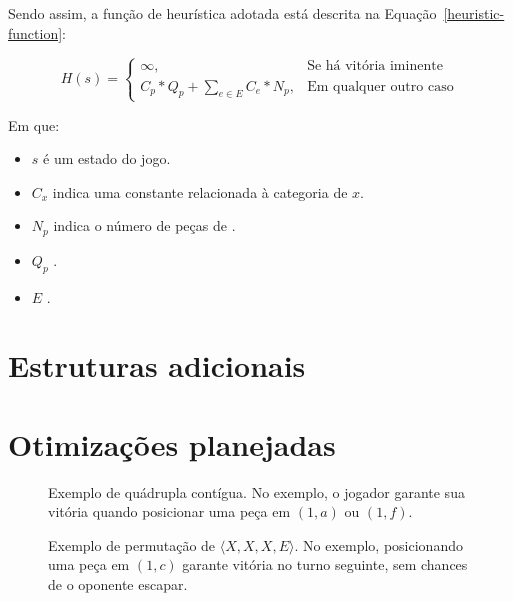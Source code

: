 \documentclass{article}
\newcommand{\todo}[1]{{\color{red}{#1}}}
\begin{document}
    Sendo assim, a função de heurística adotada está descrita na
    Equação~\ref{heuristic-function}:

    \begin{equation}
        H(s) = \begin{cases}
            \infty, & \mbox{Se há vitória iminente} \\
            C_p * Q_p + \sum_{e \in E} C_e * N_p, & \mbox{Em qualquer outro caso}
        \end{cases}
        \label{heuristic-function}
    \end{equation}

    Em que:

    \begin{itemize}
        \item $s$ é um estado do jogo.
        \item $C_x$ indica uma constante relacionada à categoria de $x$.
        \item $N_p$ indica o número de peças de \todo{noideawhat}.
        \item $Q_p$ \todo{eu realmente não lembro}.
        \item $E$ \todo{não lembro o que descreve, mas é o conjunto de $e$'s}.
    \end{itemize}

    \section{Estruturas adicionais}

    \todo{TERMINAR ESTA CAVALA IMUNDA.}

    \section{Otimizações planejadas}

    \todo{TERMINAR ESTA CAVALA IMUNDA.}

    \begin{figure}[h]
        \centering
        \caption{Exemplo de quádrupla contígua. No exemplo, o
        jogador garante sua vitória quando posicionar uma peça
        em $(1, a)$ ou $(1, f)$.\label{win-four}}
        \begin{othelloboard}{1}
            \dotmarkings{}
        \end{othelloboard}
    \end{figure}

    \begin{figure}
        \centering
        \caption{Exemplo de permutação de $\langle X, X, X, E
        \rangle$. No exemplo, posicionando uma peça em $(1, c)$
        garante vitória no turno seguinte, sem chances de o
        oponente escapar.\label{win-four-permut}}
        \begin{othelloboard}{1}
            \dotmarkings{}
        \end{othelloboard}
    \end{figure}
\end{document}

